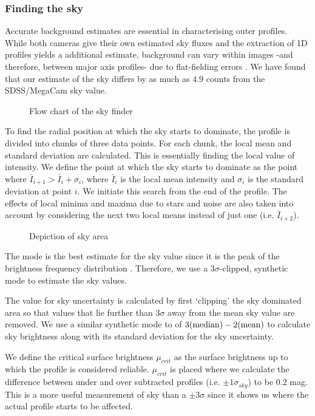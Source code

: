 \subsubsection{Finding the sky}
Accurate background estimates are essential in characterising outer profiles. While both cameras give their own estimated sky fluxes and the extraction of 1D profiles yields a additional estimate, background can vary within images -and therefore, between major axis profiles- due to flat-fielding errors \citep{bijaoui_sky_1980}. We have found that our estimate of the sky differs by as much as $4.9$ counts from the SDSS/MegaCam sky value.

\begin{figure}
	\caption{Flow chart of the sky finder}
	\label{fig: }
\end{figure}

To find the radial position at which the sky starts to dominate, the profile is divided into chunks of three data points. For each chunk, the local mean and standard deviation are calculated. This is essentially finding the local value of intensity. We define the point at which the sky starts to dominate as the point where $\bar{I}_{i+1} > \bar{I}_i + \sigma_i$, where $\bar{I}_i$ is the local mean intensity and $\sigma_i$ is the standard deviation at point $i$. We initiate this search from the end of the profile. The effects of local minima and maxima due to stars and noise are also taken into account by considering the next two local means instead of just one (i.e. $\bar{I}_{i+2}$).

\begin{figure}
	\caption{Depiction of sky area}
\end{figure}

The mode is the best estimate for the sky value since it is the peak of the brightness frequency distribution \citep{bijaoui_sky_1980}. Therefore, we use a $3\sigma$-clipped, synthetic mode to estimate the sky values.

The value for sky uncertainty is calculated by first `clipping' the sky dominated area so that values that lie further than $3\sigma$ away from the mean sky value are removed. We use a similar synthetic mode to \citet{peng_detailed_2010} of $3(\rm{median}) - 2(\rm{mean})$ to calculate sky brightness along with its standard deviation for the sky uncertainty.

We define the critical surface brightness $\mu_{crit}$ as the surface brightness up to which the profile is considered reliable. $\mu_{crit}$ is placed where we calculate the difference between under and over subtracted profiles (i.e. $\pm 1 \sigma_{sky}$) to be 0.2 mag. This is a more useful measurement of sky than a $\pm 3 \sigma$ since it shows us where the actual profile starts to be affected.

